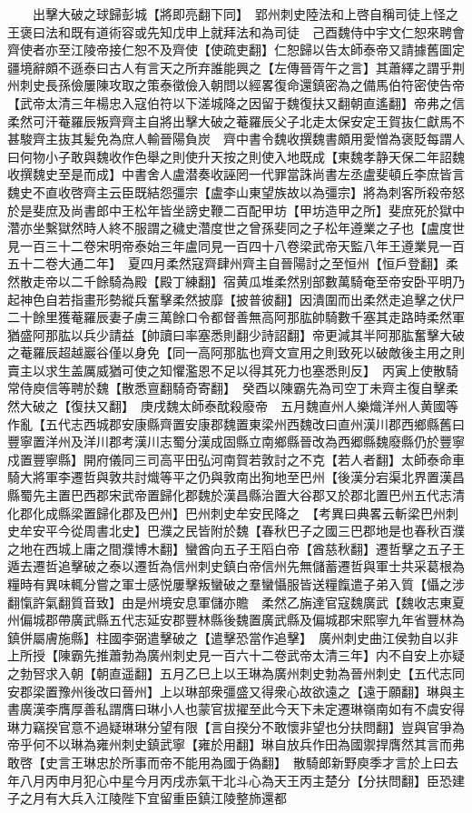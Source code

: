 　　出擊大破之球歸彭城【將即亮翻下同】　郢州刺史陸法和上啓自稱司徒上怪之王褒曰法和既有道術容或先知戊申上就拜法和為司徒　己酉魏侍中宇文仁恕來聘會齊使者亦至江陵帝接仁恕不及齊使【使疏吏翻】仁恕歸以告太師泰帝又請據舊圖定疆境辭頗不遜泰曰古人有言天之所弃誰能興之【左傳晉胥午之言】其蕭繹之謂乎荆州刺史長孫儉屢陳攻取之策泰徵儉入朝問以經畧復命還鎮密為之備馬伯符密使告帝【武帝太清三年楊忠入寇伯符以下溠城降之因留于魏復扶又翻朝直遙翻】帝弗之信　柔然可汗菴羅辰叛齊齊主自將出擊大破之菴羅辰父子北走太保安定王賀抜仁獻馬不甚駿齊主抜其髪免為庶人輸晉陽負炭　齊中書令魏收撰魏書頗用愛憎為褒貶每謂人曰何物小子敢與魏收作色舉之則使升天按之則使入地既成【東魏孝静天保二年詔魏收撰魏史至是而成】中書舍人盧潜奏收誣罔一代罪當誅尚書左丞盧斐頓丘李庶皆言魏史不直收啓齊主云臣既結怨彊宗【盧李山東望族故以為彊宗】將為刺客所殺帝怒於是斐庶及尚書郎中王松年皆坐謗史鞭二百配甲坊【甲坊造甲之所】斐庶死於獄中濳亦坐繫獄然時人終不服謂之穢史濳度世之曾孫斐同之子松年遵業之子也【盧度世見一百三十二卷宋明帝泰始三年盧同見一百四十八卷梁武帝天監八年王遵業見一百五十二卷大通二年】　夏四月柔然寇齊肆州齊主自晉陽討之至恒州【恒戶登翻】柔然散走帝以二千餘騎為殿【殿丁練翻】宿黄瓜堆柔然别部數萬騎奄至帝安卧平明乃起神色自若指畫形勢縱兵奮擊柔然披靡【披普彼翻】因潰圍而出柔然走追擊之伏尸二十餘里獲菴羅辰妻子虜三萬餘口令都督善無高阿那肱帥騎數千塞其走路時柔然軍猶盛阿那肱以兵少請益【帥讀曰率塞悉則翻少詩詔翻】帝更減其半阿那肱奮擊大破之菴羅辰超越巖谷僅以身免【同一高阿那肱也齊文宣用之則致死以破敵後主用之則賣主以求生盖厲威猶可使之知懼濫恩不足以得其死力也塞悉則反】　丙寅上使散騎常侍庾信等聘於魏【散悉亶翻騎奇寄翻】　癸酉以陳霸先為司空丁未齊主復自擊柔然大破之【復扶又翻】　庚戌魏太師泰酖殺廢帝　五月魏直州人樂熾洋州人黄國等作亂【五代志西城郡安康縣齊置安康郡魏置東梁州西魏改曰直州漢川郡西鄉縣舊曰豐寧置洋州及洋川郡考漢川志蜀分漢成固縣立南鄉縣晉改為西郷縣魏廢縣仍於豐寧戍置豐寧縣】開府儀同三司高平田弘河南賀若敦討之不克【若人者翻】太師泰命車騎大將軍李遷哲與敦共討熾等平之仍與敦南出狥地至巴州【後漢分宕渠北界置漢昌縣蜀先主置巴西郡宋武帝置歸化郡魏於漢昌縣治置大谷郡又於郡北置巴州五代志清化郡化成縣梁置歸化郡及巴州】巴州刺史牟安民降之　【考異曰典畧云斬梁巴州刺史牟安平今從周書北史】巴濮之民皆附於魏【春秋巴子之國三巴郡地是也春秋百濮之地在西城上庸之間濮博木翻】蠻酋向五子王䧟白帝【酋慈秋翻】遷哲擊之五子王遁去遷哲追擊破之泰以遷哲為信州刺史鎮白帝信州先無儲蓄遷哲與軍士共采葛根為糧時有異味輒分嘗之軍士感悦屢擊叛蠻破之羣蠻懾服皆送糧餼遣子弟入質【懾之涉翻愾許氣翻質音致】由是州境安息軍儲亦贍　柔然乙旃達官寇魏廣武【魏收志東夏州偏城郡帶廣武縣五代志延安郡豐林縣後魏置廣武縣及偏城郡宋熙寧九年省豐林為鎮併屬膚施縣】柱國李弼遣擊破之【遣擊恐當作追擊】　廣州刺史曲江侯勃自以非上所授【陳霸先推蕭勃為廣州刺史見一百六十二卷武帝太清三年】内不自安上亦疑之勃唘求入朝【朝直遥翻】五月乙巳上以王琳為廣州刺史勃為晉州刺史【五代志同安郡梁置豫州後改曰晉州】上以琳部衆彊盛又得衆心故欲遠之【遠于願翻】琳與主書廣漢李膺厚善私謂膺曰琳小人也蒙官拔擢至此今天下未定遷琳嶺南如有不虞安得琳力竊揆官意不過疑琳琳分望有限【言自揆分不敢懷非望也分扶問翻】豈與官爭為帝乎何不以琳為雍州刺史鎮武寧【雍於用翻】琳自放兵作田為國禦捍膺然其言而弗敢啓【史言王琳忠於所事而帝不能用為國于偽翻】　散騎郎新野庾季才言於上曰去年八月丙申月犯心中星今月丙戌赤氣干北斗心為天王丙主楚分【分扶問翻】臣恐建子之月有大兵入江陵陛下宜留重臣鎮江陵整斾還都